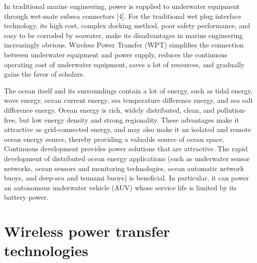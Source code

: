 In traditional marine engineering, power is supplied to underwater equipment through wet-mate subsea connectors [4]. For the traditional wet plug interface technology, its high cost, complex docking method, poor safety performance, and easy to be corroded by seawater, make its disadvantages in marine engineering increasingly obvious. Wireless Power Transfer (WPT) simplifies the connection between underwater equipment and power supply, reduces the continuous operating cost of underwater equipment, saves a lot of resources, and gradually gains the favor of scholars.

The ocean itself and its surroundings contain a lot of energy, such as tidal energy, wave energy, ocean current energy, sea temperature difference energy, and sea salt difference energy. Ocean energy is rich, widely distributed, clean, and pollution-free, but low energy density and strong regionality. These advantages make it attractive as grid-connected energy, and may also make it an isolated and remote ocean energy source, thereby providing a valuable source of ocean space. Continuous development provides power solutions that are attractive. The rapid development of distributed ocean energy applications (such as underwater sensor networks, ocean sensors and monitoring technologies, ocean automatic network buoys, and deep-sea and tsunami buoys) is beneficial. In particular, it can power an autonomous underwater vehicle (AUV) whose service life is limited by its battery power.





\section{Wireless power transfer technologies}

